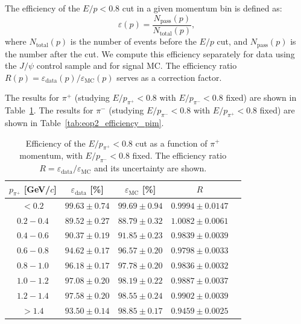 The efficiency of the \(E/p < 0.8\) cut in a given momentum bin is defined as:
\[
\varepsilon(p) = \frac{N_{\text{pass}}(p)}{N_{\text{total}}(p)},
\]
where \(N_{\text{total}}(p)\) is the number of events before the \(E/p\) cut, and \(N_{\text{pass}}(p)\) is the number after the cut. We compute this efficiency separately for data using the \(J/\psi\) control sample and for signal MC. The efficiency ratio \(R(p) = \varepsilon_{\text{data}}(p)/\varepsilon_{\text{MC}}(p)\) serves as a correction factor.

The results for \(\pi^+\) (studying \(E/p_{\pi^+}<0.8\) with \(E/p_{\pi^-}<0.8\) fixed) are shown in Table~\ref{tab:eop1_efficiency_pip}. The results for \(\pi^-\) (studying \(E/p_{\pi^-}<0.8\) with \(E/p_{\pi^+}<0.8\) fixed) are shown in Table~\ref{tab:eop2_efficiency_pim}.

\begin{table}[htbp]
    \begin{center}
        \caption{Efficiency of the \(E/p_{\pi^+}<0.8\) cut as a function of \(\pi^+\) momentum, with \(E/p_{\pi^-}<0.8\) fixed. The efficiency ratio \(R = \varepsilon_{\text{data}}/\varepsilon_{\text{MC}}\) and its uncertainty are shown.}
        \vspace{4mm}
        \renewcommand{\arraystretch}{1.3}
        \begin{tabular}{c | c c c c}
            \hline \hline
            \(p_{\pi^+}\) [GeV/\(c\)] & \(\varepsilon_{\text{data}}\) [\%] & \(\varepsilon_{\text{MC}}\) [\%] & \(R\) \\
            \hline
            \(<0.2\)   & \(99.63\pm0.74\) & \(99.69\pm0.94\) & \(0.9994\pm0.0147\) \\
            \(0.2-0.4\) & \(89.52\pm0.27\) & \(88.79\pm0.32\) & \(1.0082\pm0.0061\) \\
            \(0.4-0.6\) & \(90.37\pm0.19\) & \(91.85\pm0.23\) & \(0.9839\pm0.0039\) \\
            \(0.6-0.8\) & \(94.62\pm0.17\) & \(96.57\pm0.20\) & \(0.9798\pm0.0033\) \\
            \(0.8-1.0\) & \(96.18\pm0.17\) & \(97.78\pm0.20\) & \(0.9836\pm0.0032\) \\
            \(1.0-1.2\) & \(97.08\pm0.20\) & \(98.19\pm0.22\) & \(0.9887\pm0.0037\) \\
            \(1.2-1.4\) & \(97.58\pm0.20\) & \(98.55\pm0.24\) & \(0.9902\pm0.0039\) \\
            \(>1.4\)    & \(93.50\pm0.14\) & \(98.85\pm0.17\) & \(0.9459\pm0.0025\) \\
            \hline \hline
        \end{tabular}
        \label{tab:eop1_efficiency_pip}
    \end{center}
\end{table}

